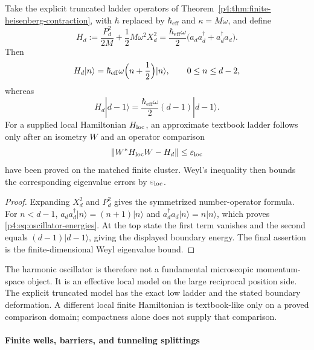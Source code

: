 \documentclass[12pt,a4paper]{article}
\begin{document}
\begin{corollary}
\label{p4:cor:truncated-oscillator}
Take the explicit truncated ladder operators of
Theorem~\ref{p4:thm:finite-heisenberg-contraction}, with \(\hbar\) replaced by
\(\hbar_{\mathrm{eff}}\) and \(\kappa=M\omega\), and define
\[
H_d:=\frac{P_d^2}{2M}+\frac12M\omega^2X_d^2
=\frac{\hbar_{\mathrm{eff}}\omega}{2}
\bigl(a_da_d^\dagger+a_d^\dagger a_d\bigr).
\]
Then
\begin{equation}
\label{p4:eq:oscillator-energies}
H_d|n\rangle
=
\hbar_{\mathrm{eff}}\omega\Bigl(n+\frac12\Bigr)|n\rangle,
\qquad 0\le n\le d-2,
\end{equation}
whereas
\[
H_d|d-1\rangle
=
\frac{\hbar_{\mathrm{eff}}\omega}{2}(d-1)|d-1\rangle .
\]
For a supplied local Hamiltonian \(H_{\rm loc}\), an approximate textbook
ladder follows only after an isometry \(W\) and an operator comparison
\[
\|W^*H_{\rm loc}W-H_d\|\le\varepsilon_{\rm loc}
\]
have been proved on the matched finite cluster.  Weyl's inequality then bounds
the corresponding eigenvalue errors by \(\varepsilon_{\rm loc}\).
\end{corollary}

\begin{proof}
Expanding \(X_d^2\) and \(P_d^2\) gives the symmetrized number-operator
formula.  For \(n<d-1\),
\(a_da_d^\dagger|n\rangle=(n+1)|n\rangle\) and
\(a_d^\dagger a_d|n\rangle=n|n\rangle\), which proves
\eqref{p4:eq:oscillator-energies}.  At the top state the first term vanishes
and the second equals \((d-1)|d-1\rangle\), giving the displayed boundary
energy.  The final assertion is the finite-dimensional Weyl eigenvalue bound.
\end{proof}


\begin{remark}
\label{p4:rem:oscillator-framework}
The harmonic oscillator is therefore not a fundamental microscopic momentum-space object.
It is an effective local model on the large reciprocal position side.
The explicit truncated model has the exact low ladder and the stated boundary
deformation.  A different local finite Hamiltonian is textbook-like only on a
proved comparison domain; compactness alone does not supply that comparison.
\end{remark}



\paragraph{Finite wells, barriers, and tunneling splittings}
\label{p4:sec:part2-well-barrier}
\end{document}
